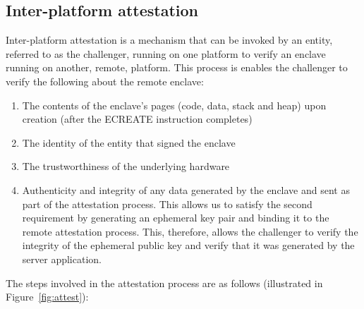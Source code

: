 \documentclass[../main.tex]{subfiles}
\begin{document}
		\subsection{Inter-platform attestation} %
		Inter-platform attestation is a mechanism that can be invoked by an entity, referred to as the challenger, running on one platform
		to verify an enclave running on another, remote, platform. This process is enables the challenger to verify the following about the remote enclave:
		\begin{enumerate}
			\item The contents of the enclave's pages (code, data, stack and heap) upon creation (after the ECREATE instruction completes)
			\item The identity of the entity that signed the enclave 
			\item The trustworthiness of the underlying hardware
			\item Authenticity and integrity of any data generated by the enclave and sent as part of the attestation process. This allows us to satisfy the second requirement by generating an ephemeral key
			pair and binding it to the remote attestation process. This, therefore, allows the challenger to verify the integrity of the ephemeral public key and verify that it was generated by the server application.
		\end{enumerate}
		The steps involved in the attestation process are as follows (illustrated in Figure~\ref{fig:attest}):
\end{document}
